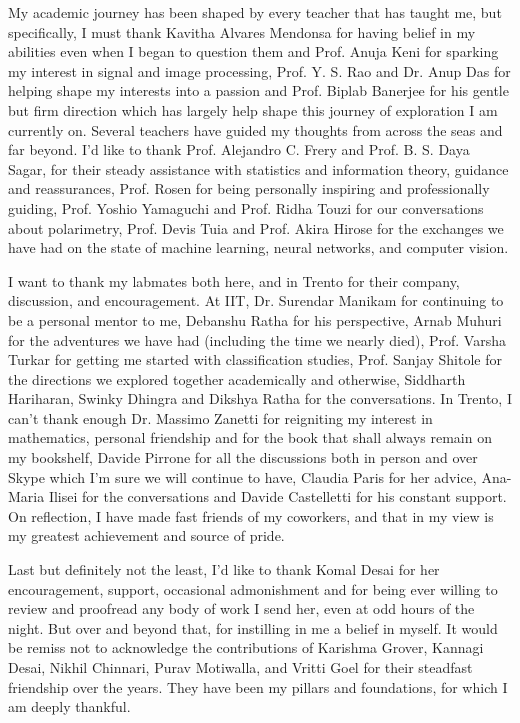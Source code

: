 My academic journey has been shaped by every teacher that has taught me, but specifically, I must thank Kavitha Alvares Mendonsa for having belief in my abilities even when I began to question them and Prof. Anuja Keni for sparking my interest in signal and image processing, Prof. Y. S. Rao and Dr. Anup Das for helping shape my interests into a passion and  Prof. Biplab Banerjee for his gentle but firm direction which has largely help shape this journey of exploration I am currently on. Several teachers have guided my thoughts from across the seas and far beyond. I'd like to thank Prof. Alejandro C. Frery and Prof. B. S. Daya Sagar, for their steady assistance with statistics and information theory, guidance and reassurances, Prof. Rosen for being personally inspiring and professionally guiding, Prof. Yoshio Yamaguchi and Prof. Ridha Touzi for our conversations about polarimetry, Prof. Devis Tuia and Prof. Akira Hirose for the exchanges we have had on the state of machine learning, neural networks, and computer vision. 

I want to thank my labmates both here, and in Trento for their company, discussion, and encouragement. At IIT, Dr. Surendar Manikam for continuing to be a personal mentor to me, Debanshu Ratha for his perspective, Arnab Muhuri for the adventures we have had (including the time we nearly died), Prof. Varsha Turkar for getting me started with classification studies, Prof. Sanjay Shitole for the directions we explored together academically and otherwise, Siddharth Hariharan, Swinky Dhingra and Dikshya Ratha for the conversations. In Trento, I can't thank enough Dr. Massimo Zanetti for reigniting my interest in mathematics, personal friendship and for the book that shall always remain on my bookshelf, Davide Pirrone for all the discussions both in person and over Skype which I'm sure we will continue to have, Claudia Paris for her advice, Ana-Maria Ilisei for the conversations and Davide Castelletti for his constant support. On reflection, I have made fast friends of my coworkers, and that in my view is my greatest achievement and source of pride. 

Last but definitely not the least, I'd like to thank Komal Desai for her encouragement, support, occasional admonishment and for being ever willing to review and proofread any body of work I send her, even at odd hours of the night. But over and beyond that, for instilling in me a belief in myself. It would be remiss not to acknowledge the contributions of Karishma Grover, Kannagi Desai, Nikhil Chinnari, Purav Motiwalla, and Vritti Goel for their steadfast friendship over the years. They have been my pillars and foundations, for which I am deeply thankful. 

